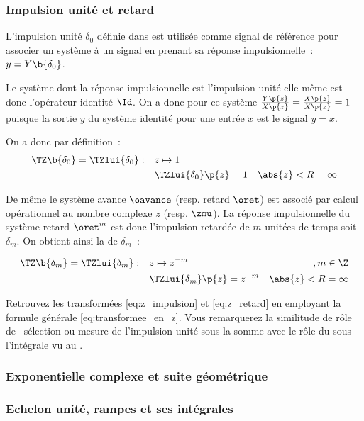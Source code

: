 \subsubsection{Impulsion unité et retard}

L'impulsion unité $\delta_0$ définie dans 
est utilisée comme signal de référence pour associer un système à un
signal en prenant sa réponse impulsionnelle~: $y=Y\b{\delta_0}$.

Le système dont la réponse impulsionnelle est l'impulsion unité
elle-même est donc l'opérateur identité $\Id$. On a donc pour ce
système $\frac{Y\p{z}}{X\p{z}}=\frac{X\p{z}}{X\p{z}}=1$ puisque la
sortie $y$ du système identité pour une entrée $x$ est le signal
$y=x$.

On a donc par définition~:
\begin{align}
  \label{eq:z_impulsion}
  \TZ\b{\delta_0}=\TZlui{\delta_0} : \quad &z \mapsto 1 \nonumber\\
  &\TZlui{\delta_0}\p{z} = 1 & \abs{z}<R = \infty
\end{align}

De même le système avance $\oavance$ (resp. retard $\oret$) est
associé par calcul opérationnel au nombre complexe $z$
(resp. $\zmu$). La réponse impulsionnelle du système retard $\oret^m$
est donc l'impulsion retardée de $m$ unitées de temps soit
$\delta_m$. On obtient ainsi la \teZ{} de $\delta_m$~:

\begin{align}
  \label{eq:z_retard}
  \TZ\b{\delta_m}=\TZlui{\delta_m}: \quad &z \mapsto z^{-m} &, m\in\Z \nonumber\\
  &\TZlui{\delta_m}\p{z} = z^{-m}  &  \abs{z}<R = \infty
\end{align}

\begin{exercice}
  Retrouvez les transformées \eqref{eq:z_impulsion} et \eqref{eq:z_retard} en employant la formule générale \eqref{eq:transformee_en_z}. Vous remarquerez la similitude de rôle de \og{} sélection ou mesure \fg{} de l'impulsion unité sous la somme avec le rôle du \Dirac{} sous l'intégrale vu au .
\end{exercice}
\subsubsection{Exponentielle complexe et suite géométrique}
\subsubsection{Echelon unité, rampes et ses intégrales}
